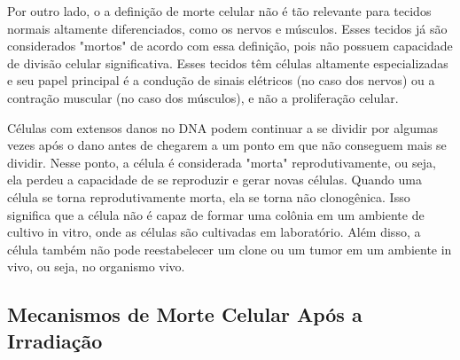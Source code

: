 \documentclass[11pt,a4paper]{article}
\begin{document}
	Por outro lado, o a definição de morte celular não é tão relevante para tecidos normais altamente diferenciados, como os nervos e músculos. Esses tecidos já são considerados "mortos" de acordo com essa definição, pois não possuem capacidade de divisão celular significativa. Esses tecidos têm células altamente especializadas e seu papel principal é a condução de sinais elétricos (no caso dos nervos) ou a contração muscular (no caso dos músculos), e não a proliferação celular.

	Células com extensos danos no DNA podem continuar a se dividir por algumas vezes após o dano antes de chegarem a um ponto em que não conseguem mais se dividir. Nesse ponto, a célula é considerada "morta" reprodutivamente, ou seja, ela perdeu a capacidade de se reproduzir e gerar novas células. Quando uma célula se torna reprodutivamente morta, ela se torna não clonogênica. Isso significa que a célula não é capaz de formar uma colônia em um ambiente de cultivo in vitro, onde as células são cultivadas em laboratório. Além disso, a célula também não pode reestabelecer um clone ou um tumor em um ambiente in vivo, ou seja, no organismo vivo.

\subsection{Mecanismos de Morte Celular Após a Irradiação}
\end{document}
